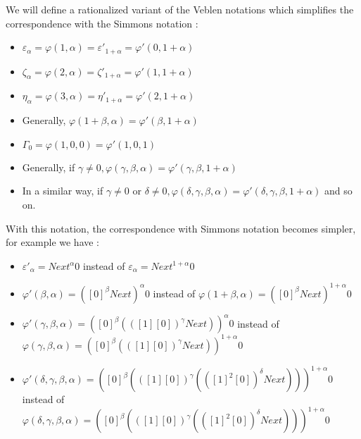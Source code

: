 \documentclass[10pt]{article}
\begin{document}
We will define a rationalized variant of the Veblen notations which simplifies the correspondence with the Simmons notation :

\begin{itemize}

\item \( \varepsilon_\alpha = \varphi(1,\alpha) = \varepsilon'_{1+\alpha} = \varphi'(0,1+\alpha) \)

\item \( \zeta_\alpha = \varphi(2,\alpha) = \zeta'_{1+\alpha} = \varphi'(1,1+\alpha) \)

\item \( \eta_\alpha = \varphi(3,\alpha) = \eta'_{1+\alpha} = \varphi'(2,1+\alpha) \)

\item Generally, \( \varphi(1+\beta,\alpha) = \varphi'(\beta,1+\alpha) \)

\item \( \Gamma_0 = \varphi(1,0,0) = \varphi'(1,0,1) \)

\item Generally, if \( \gamma \neq 0, \varphi(\gamma,\beta,\alpha) = \varphi'(\gamma,\beta,1+\alpha) \)

\item In a similar way, if \( \gamma \neq 0 \) or \( \delta \neq 0, \varphi(\delta,\gamma,\beta,\alpha) = \varphi'(\delta,\gamma,\beta,1+\alpha) \) and so on.

\end{itemize}

With this notation, the correspondence with Simmons notation becomes simpler, for example we have :

\begin{itemize}

\item 
\( \varepsilon'_\alpha = Next^\alpha 0 \) instead of \( \varepsilon_\alpha = Next^{1+\alpha} 0 \)

\item
\( \varphi'(\beta,\alpha) = ([0]^\beta Next)^\alpha 0 \) 
instead of
\( \varphi(1+\beta,\alpha) = ([0]^\beta Next)^{1+\alpha} 0 \) 

\item
\( \varphi'(\gamma,\beta,\alpha) = ([0]^\beta (([1] [0])^\gamma Next))^\alpha 0 \)
instead of 
\( \varphi(\gamma,\beta,\alpha) = ([0]^\beta (([1] [0])^\gamma Next))^{1+\alpha} 0 \)

\item
\( \varphi'(\delta,\gamma,\beta,\alpha) = ([0]^\beta (([1] [0])^\gamma (([1]^2 [0])^\delta Next)))^{1+\alpha} 0  \) 
instead of 
\( \varphi(\delta,\gamma,\beta,\alpha) = ([0]^\beta (([1] [0])^\gamma (([1]^2 [0])^\delta Next)))^{1+\alpha} 0  \) 

\end{itemize}
\end{document}
